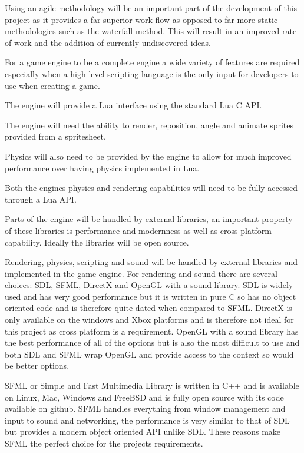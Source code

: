\documentclass[11pt,a4paper,titlepage]{article}
\begin{document}

	Using an agile methodology will be an important part of the development of this project as it provides a far superior work flow as opposed to far more static methodologies such as the waterfall method. This will result in an improved rate of work and the addition of currently undiscovered ideas.


	For a game engine to be a complete engine a wide variety of features are required especially when a high level scripting language is the only input for developers to use when creating a game.

	The engine will provide a Lua interface using the standard Lua C API.

	The engine will need the ability to render, reposition, angle and animate sprites provided from a spritesheet.

	Physics will also need to be provided by the engine to allow for much improved performance over having physics implemented in Lua.

	Both the engines physics and rendering capabilities will need to be fully accessed through a Lua API.


	Parts of the engine will be handled by external libraries, an important property of these libraries is performance and modernness as well as cross platform capability. Ideally the libraries will be open source.

	Rendering, physics, scripting and sound will be handled by external libraries and implemented in the game engine. For rendering and sound there are several choices: SDL, SFML, DirectX and OpenGL with a sound library. SDL is widely used and has very good performance but it is written in pure C so has no object oriented code and is therefore quite dated when compared to SFML. DirectX is only available on the windows and Xbox platforms and is therefore not ideal for this project as cross platform is a requirement. OpenGL with a sound library has the best performance of all of the options but is also the most difficult to use and both SDL and SFML wrap OpenGL and provide access to the context so would be better options.

	SFML or Simple and Fast Multimedia Library is written in C++ and is available on Linux, Mac, Windows and FreeBSD and is fully open source with its code available on github. SFML handles everything from window management and input to sound and networking, the performance is very similar to that of SDL but provides a modern object oriented API unlike SDL. These reasons make SFML the perfect choice for the projects requirements.
\end{document}
